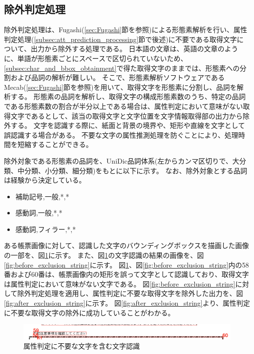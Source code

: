 \subsection{除外判定処理}\label{subsec:exclusion_judgement_processing}
除外判定処理は、Fugashi(\ref{sec:Fugashi}節を参照)による形態素解析を行い、属性判定処理(\ref{subsec:att_prediction_processing}節で後述)に不要である取得文字について、出力から除外する処理である。
日本語の文章は、英語の文章のように、単語が形態素ごとにスペースで区切られていないため、\ref{subsec:char_and_bbox_obtainment}で得た取得文字のままでは、形態素への分割および品詞の解析が難しい。
そこで、形態素解析ソフトウェアであるMecab(\ref{sec:Fugashi}節を参照)を用いて、取得文字を形態素に分割し、品詞を解析する。
形態素の品詞を解析し、取得文字の構成形態素数のうち、特定の品詞である形態素数の割合が半分以上である場合は、属性判定において意味がない取得文字であるとして、該当の取得文字と文字位置を文字情報取得部の出力から除外する。
文字を認識する際に、紙面と背景の境界や、矩形や直線を文字として誤認識する場合がある。
不要な文字の属性推測処理を防ぐことにより、処理時間を短縮することができる。

除外対象である形態素の品詞を、UniDic品詞体系(左からカンマ区切りで、大分類、中分類、小分類、細分類)をもとに以下に示す。
なお、除外対象とする品詞は経験から決定している。

\begin{itemize}
    \item 補助記号,一般,*,*
    \item 感動詞,一般,*,*
    \item 感動詞,フィラー,*,*
\end{itemize}

ある帳票画像に対して、認識した文字のバウンディングボックスを描画した画像の一部を、図\ref{fig:before_exclusion_bbox}に示す。
また、図\ref{fig:before_exclusion_bbox}の文字認識の結果の画像を、図\ref{fig:before_exclusion_string}に示す。
図\ref{fig:before_exclusion_bbox}、図\ref{fig:before_exclusion_string}内の58番および60番は、帳票画像内の矩形を誤って文字として認識しており、取得文字は属性判定において意味がない文字である。
図\ref{fig:before_exclusion_string}に対して除外判定処理を適用し、属性判定に不要な取得文字を除外した出力を、図\ref{fig:after_exclusion_string}に示す。
図\ref{fig:after_exclusion_string}より、属性判定に不要な取得文字の除外に成功していることがわかる。

\begin{figure}[t]
    \begin{center}
        \includegraphics[width=15cm]{image/04-implementation/before_exclusion_bbox.png}
        \caption{属性判定に不要な文字を含む文字認識}
        \label{fig:before_exclusion_bbox}
    \end{center}
\end{figure}

